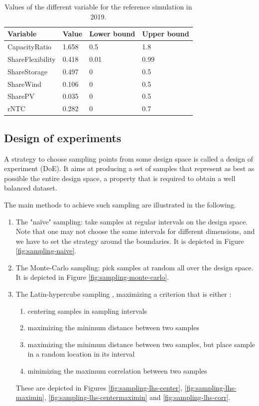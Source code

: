 \begin{table}[h]
    \centering
    \begin{tabular}{|l l l l|}
        \hline
        Variable         & Value  & Lower bound & Upper bound \\ \hline
        CapacityRatio    & 1.658  & 0.5         & 1.8         \\
        ShareFlexibility & 0.418  & 0.01        & 0.99        \\
        ShareStorage     & 0.497  & 0           & 0.5         \\
        ShareWind        & 0.106  & 0           & 0.5         \\
        SharePV          & 0.035  & 0           & 0.5         \\
        rNTC             & 0.282  & 0           & 0.7         \\ \hline
    \end{tabular}
    \caption{Values of the different variable for the reference simulation in 2019.}
    \label{table:reference-values}
\end{table}

\subsection{Design of experiments}

A strategy to choose sampling points from some design space is called a design of experiment (DoE). It aims at producing a set of samples that represent as best as possible the entire design space, a property that is required to obtain a well balanced dataset. 

The main methods to achieve such sampling are \cite{doe} illustrated in the following.
\begin{enumerate}
    \item The "naïve" sampling: take samples at regular intervals on the design space. Note that one may not choose the same intervals for different dimensions, and we have to set the strategy around the boundaries. It is depicted in Figure \ref{fig:sampling-naive}.
    \item The Monte-Carlo sampling: pick samples at random all over the design space. It is depicted in Figure \ref{fig:sampling-monte-carlo}.
    \item The Latin-hypercube sampling \cite{wiki-lhs}, maximizing a criterion that is either \cite{pydoe-docs}:
    \begin{enumerate}
        \item centering samples in sampling intervals
        \item maximizing the minimum distance between two samples
        \item maximizing the minimum distance between two samples, but place sample in a random location in its interval
        \item minimizing the maximum correlation between two samples
    \end{enumerate}
    These are depicted in Figures \ref{fig:sampling-lhs-center}, \ref{fig:sampling-lhs-maximin}, \ref{fig:sampling-lhs-centermaximin} and \ref{fig:sampling-lhs-corr}.
\end{enumerate}

